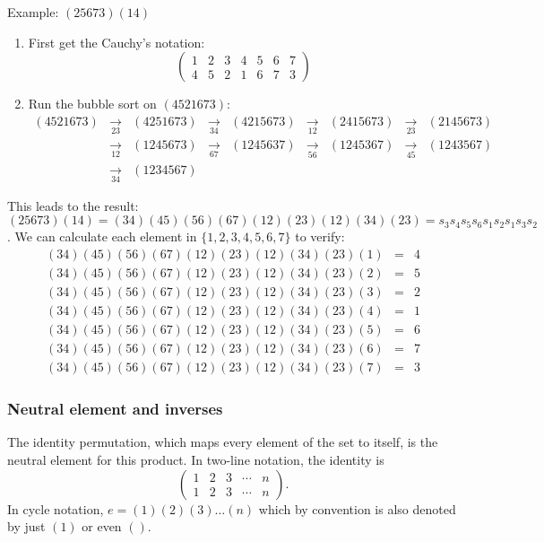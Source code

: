 Example: $(25673)(14)$
\begin{enumerate}
    \item First get the Cauchy's notation: 
        $$
        \begin{pmatrix}
            1&2&3&4&5&6&7\\
            4&5&2&1&6&7&3
        \end{pmatrix}
        $$
    \item Run the bubble sort on $(4521673)$:
        $$
        \begin{array}{ccccccccc}
            (4521673)&\underset{23}{\longrightarrow}&(4251673)&\underset{34}{\longrightarrow}&(4215673)
            &\underset{12}{\longrightarrow}&(2415673)&\underset{23}{\longrightarrow}&(2145673)\\
            &\underset{12}{\longrightarrow}&(1245673)&\underset{67}{\longrightarrow}&(1245637)
            &\underset{56}{\longrightarrow}&(1245367)&\underset{45}{\longrightarrow}&(1243567)\\
            &\underset{34}{\longrightarrow}&(1234567)
        \end{array}
        $$
\end{enumerate}
This leads to the result: $(25673)(14)=(34)(45)(56)(67)(12)(23)(12)(34)(23)=s_3s_4s_5s_6s_1s_2s_1s_3s_2$.
We can calculate each element in $\{1,2,3,4,5,6,7\}$ to verify:
$$
\begin{array}{ccc}
    (34)(45)(56)(67)(12)(23)(12)(34)(23)(1)&=&4\\
    (34)(45)(56)(67)(12)(23)(12)(34)(23)(2)&=&5\\
    (34)(45)(56)(67)(12)(23)(12)(34)(23)(3)&=&2\\
    (34)(45)(56)(67)(12)(23)(12)(34)(23)(4)&=&1\\
    (34)(45)(56)(67)(12)(23)(12)(34)(23)(5)&=&6\\
    (34)(45)(56)(67)(12)(23)(12)(34)(23)(6)&=&7\\
    (34)(45)(56)(67)(12)(23)(12)(34)(23)(7)&=&3
\end{array}
$$


\subsubsection{Neutral element and inverses}
The identity permutation, which maps every element of the set to itself, is the neutral element for this product.
In two-line notation, the identity is
$$\begin{pmatrix}1&2&3&\cdots &n\\1&2&3&\cdots &n\end{pmatrix}.$$
In cycle notation, $e=(1)(2)(3)\dots(n)$ which by convention is also denoted by just $(1)$ or even $()$.

